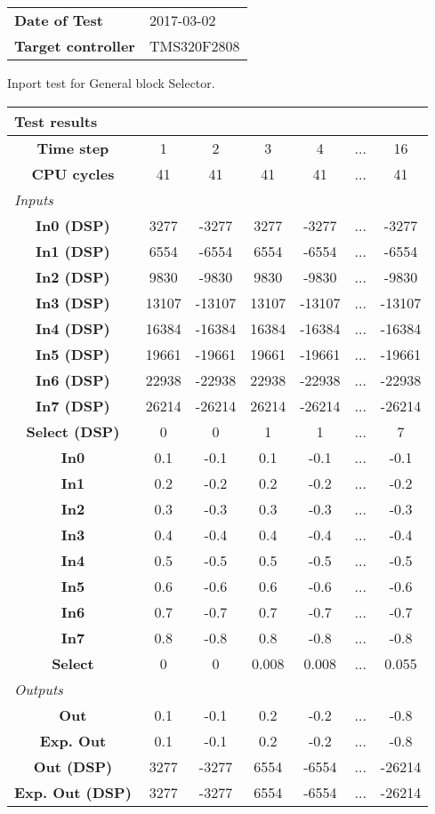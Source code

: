 \begin{tabular}{l l}
\textbf{Date of Test} & 2017-03-02 \tabularnewline
\textbf{Target controller} & TMS320F2808 \tabularnewline
\end{tabular}
\vspace{1ex}
Inport test for General block Selector.

\vspace{1em}
\begin{tabularx}{\textwidth}{|c|c|c|c|c|>{\centering\arraybackslash}X|c|}
\hline
\multicolumn{7}{|l|}{\cellcolor[gray]{0.8}\textbf{Test results}} \tabularnewline \hline
\textbf{Time step} & 1 & 2 & 3 & 4 & ... & 16 \tabularnewline \hline
\textbf{CPU cycles} & 41 & 41 & 41 & 41 & ... & 41 \tabularnewline \hline
\multicolumn{7}{|l|}{\cellcolor[gray]{0.9}\textit{Inputs}} \tabularnewline \hline
\textbf{In0 (DSP)} & 3277 & -3277 & 3277 & -3277 & ... & -3277 \tabularnewline \hline
\textbf{In1 (DSP)} & 6554 & -6554 & 6554 & -6554 & ... & -6554 \tabularnewline \hline
\textbf{In2 (DSP)} & 9830 & -9830 & 9830 & -9830 & ... & -9830 \tabularnewline \hline
\textbf{In3 (DSP)} & 13107 & -13107 & 13107 & -13107 & ... & -13107 \tabularnewline \hline
\textbf{In4 (DSP)} & 16384 & -16384 & 16384 & -16384 & ... & -16384 \tabularnewline \hline
\textbf{In5 (DSP)} & 19661 & -19661 & 19661 & -19661 & ... & -19661 \tabularnewline \hline
\textbf{In6 (DSP)} & 22938 & -22938 & 22938 & -22938 & ... & -22938 \tabularnewline \hline
\textbf{In7 (DSP)} & 26214 & -26214 & 26214 & -26214 & ... & -26214 \tabularnewline \hline
\textbf{Select (DSP)} & 0 & 0 & 1 & 1 & ... & 7 \tabularnewline \hline
\textbf{In0} & 0.1 & -0.1 & 0.1 & -0.1 & ... & -0.1 \tabularnewline \hline
\textbf{In1} & 0.2 & -0.2 & 0.2 & -0.2 & ... & -0.2 \tabularnewline \hline
\textbf{In2} & 0.3 & -0.3 & 0.3 & -0.3 & ... & -0.3 \tabularnewline \hline
\textbf{In3} & 0.4 & -0.4 & 0.4 & -0.4 & ... & -0.4 \tabularnewline \hline
\textbf{In4} & 0.5 & -0.5 & 0.5 & -0.5 & ... & -0.5 \tabularnewline \hline
\textbf{In5} & 0.6 & -0.6 & 0.6 & -0.6 & ... & -0.6 \tabularnewline \hline
\textbf{In6} & 0.7 & -0.7 & 0.7 & -0.7 & ... & -0.7 \tabularnewline \hline
\textbf{In7} & 0.8 & -0.8 & 0.8 & -0.8 & ... & -0.8 \tabularnewline \hline
\textbf{Select} & 0 & 0 & 0.008 & 0.008 & ... & 0.055 \tabularnewline \hline
\multicolumn{7}{|l|}{\cellcolor[gray]{0.9}\textit{Outputs}} \tabularnewline \hline
\textbf{Out} & 0.1 & -0.1 & 0.2 & -0.2 & ... & -0.8 \tabularnewline \hline
\textbf{Exp. Out} & 0.1 & -0.1 & 0.2 & -0.2 & ... & -0.8 \tabularnewline \hline
\textbf{Out (DSP)} & 3277 & -3277 & 6554 & -6554 & ... & -26214 \tabularnewline \hline
\textbf{Exp. Out (DSP)} & 3277 & -3277 & 6554 & -6554 & ... & -26214 \tabularnewline \hline
\end{tabularx}
\vspace{1ex}

